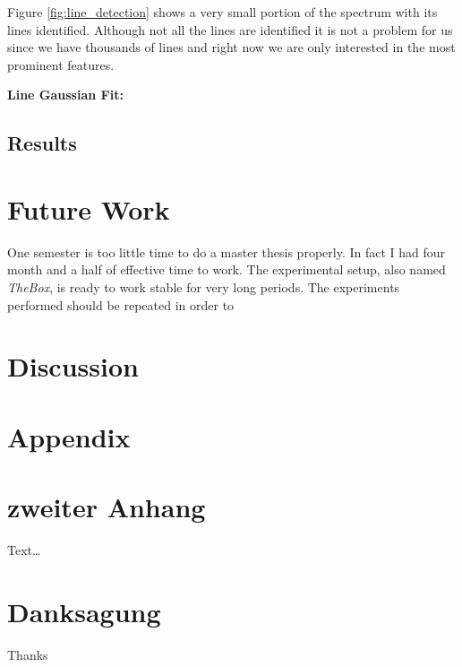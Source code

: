 \documentclass[master,       %
               twoside,        %
               BCOR10mm,       %
               ngerman,english  %
               ]{GAUBM_astro}
\begin{document}
Figure \ref{fig:line_detection} shows a very small portion of the spectrum with its lines identified. Although not all the lines 
are identified it is not a problem for us since we have thousands of lines and right now we are only interested in the most 
prominent features.

\textbf{Line Gaussian Fit:}


\section{Results}

\chapter{Future Work}

One semester is too little time to do a master thesis properly. In fact I had four month and a half of effective time to work.
The experimental setup, also named \emph{TheBox}, is ready to work stable for very long periods. The experiments performed should be repeated 
in order to 


\chapter{Discussion}


\appendix
\chapter{Appendix}


\chapter{zweiter Anhang}
Text\dots

\cleardoublepage
 

\chapter*{Danksagung}
Thanks
\Declaration
\end{document}
